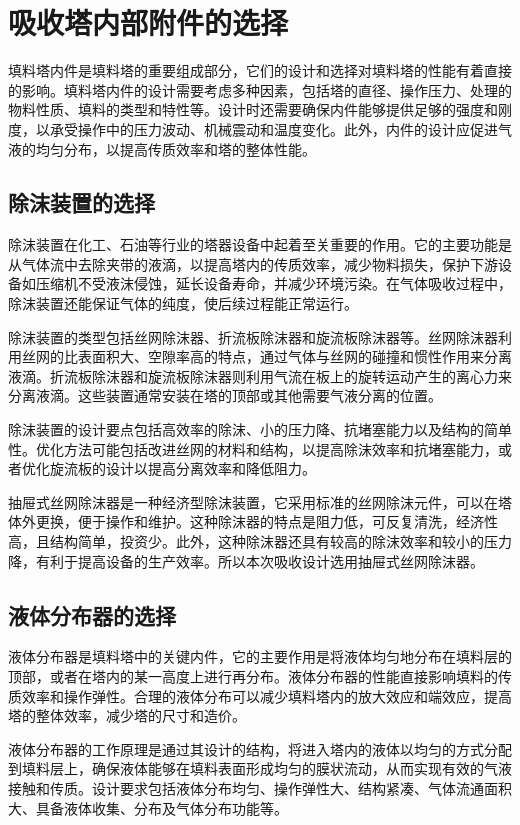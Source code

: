 \chapter{吸收塔内部附件的选择}
填料塔内件是填料塔的重要组成部分，它们的设计和选择对填料塔的性能有着直接的影响。填料塔内件的设计需要考虑多种因素，包括塔的直径、操作压力、处理的物料性质、填料的类型和特性等。设计时还需要确保内件能够提供足够的强度和刚度，以承受操作中的压力波动、机械震动和温度变化。此外，内件的设计应促进气液的均匀分布，以提高传质效率和塔的整体性能。


\section{除沫装置的选择}
除沫装置在化工、石油等行业的塔器设备中起着至关重要的作用。它的主要功能是从气体流中去除夹带的液滴，以提高塔内的传质效率，减少物料损失，保护下游设备如压缩机不受液沫侵蚀，延长设备寿命，并减少环境污染。在气体吸收过程中，除沫装置还能保证气体的纯度，使后续过程能正常运行。

除沫装置的类型包括丝网除沫器、折流板除沫器和旋流板除沫器等。丝网除沫器利用丝网的比表面积大、空隙率高的特点，通过气体与丝网的碰撞和惯性作用来分离液滴。折流板除沫器和旋流板除沫器则利用气流在板上的旋转运动产生的离心力来分离液滴。这些装置通常安装在塔的顶部或其他需要气液分离的位置。

除沫装置的设计要点包括高效率的除沫、小的压力降、抗堵塞能力以及结构的简单性。优化方法可能包括改进丝网的材料和结构，以提高除沫效率和抗堵塞能力，或者优化旋流板的设计以提高分离效率和降低阻力。

抽屉式丝网除沫器是一种经济型除沫装置，它采用标准的丝网除沫元件，可以在塔体外更换，便于操作和维护。这种除沫器的特点是阻力低，可反复清洗，经济性高，且结构简单，投资少。此外，这种除沫器还具有较高的除沫效率和较小的压力降，有利于提高设备的生产效率。所以本次吸收设计选用抽屉式丝网除沫器。



\section{液体分布器的选择}
液体分布器是填料塔中的关键内件，它的主要作用是将液体均匀地分布在填料层的顶部，或者在塔内的某一高度上进行再分布。液体分布器的性能直接影响填料的传质效率和操作弹性。合理的液体分布可以减少填料塔内的放大效应和端效应，提高塔的整体效率，减少塔的尺寸和造价。

液体分布器的工作原理是通过其设计的结构，将进入塔内的液体以均匀的方式分配到填料层上，确保液体能够在填料表面形成均匀的膜状流动，从而实现有效的气液接触和传质。设计要求包括液体分布均匀、操作弹性大、结构紧凑、气体流通面积大、具备液体收集、分布及气体分布功能等。

